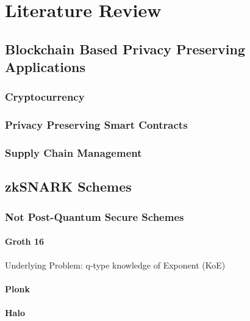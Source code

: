 \chapter{Literature Review}


\section{Blockchain Based Privacy Preserving Applications}

\subsection{Cryptocurrency}

\subsection{Privacy Preserving Smart Contracts}

\subsection{Supply Chain Management}




\section{zkSNARK Schemes}


\subsection{Not Post-Quantum Secure Schemes}
\subsubsection{Groth 16}
Underlying Problem: q-type knowledge of Exponent (KoE)
\subsubsection{Plonk}

\subsubsection{Halo}

